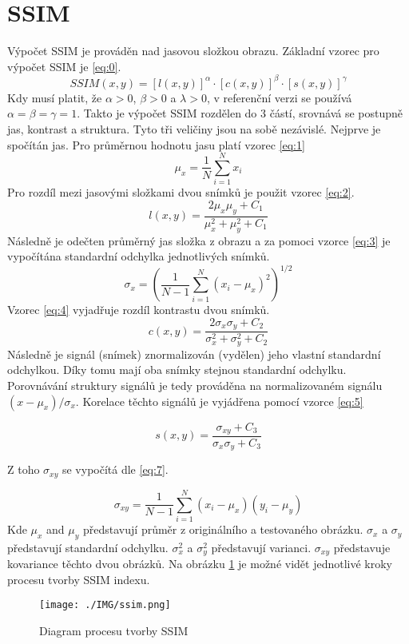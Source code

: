 \documentclass[thesis=M,czech]{FITthesis}[2016/06/26]
\begin{document}
\section{SSIM}
Výpočet SSIM je prováděn nad jasovou složkou obrazu. Základní vzorec pro výpočet SSIM je \ref{eq:0}.
\begin{equation}  \label{eq:0}
\mathit{SSIM}(x, y) = [l(x, y)]^{\alpha}\cdot[c(x, y)]^\beta\cdot[s(x, y)]^\gamma
\end{equation}
Kdy musí platit, že $\alpha > 0$, $\beta > 0$ a $\lambda > 0$, v referenční verzi se používá $\alpha = \beta = \gamma = 1$\cite{SSIM1}.
Takto je výpočet SSIM rozdělen do 3 částí, srovnává se postupně jas, kontrast a struktura. Tyto tři veličiny jsou na sobě nezávislé. Nejprve je spočítán jas. Pro průměrnou hodnotu jasu platí vzorec \ref{eq:1}
\begin{equation} \label{eq:1}
\mu_x = \frac{1}{N}\sum_{i=1}^{N}x_i
\end{equation}
Pro rozdíl mezi jasovými složkami dvou snímků je použit vzorec \ref{eq:2}.
\begin{equation} \label{eq:2}
l(x, y) = \frac{2\mu_x \mu_y + C_1}{\mu^2_x+\mu^2_y+C_1}
\end{equation}
Následně je odečten průměrný jas složka z obrazu a za pomoci vzorce \ref{eq:3} je vypočítána standardní odchylka jednotlivých snímků.
\begin{equation} \label{eq:3}
\sigma_x = \left(\frac{1}{N-1}\sum_{i=1}^{N}(x_i-\mu_x)^2\right)^{1/2}
\end{equation}
Vzorec \ref{eq:4} vyjadřuje rozdíl kontrastu dvou snímků.
\begin{equation}\label{eq:4}
c(x, y) = \frac{2\sigma_x \sigma_y + C_2}{\sigma^2_x+\sigma^2_y+C_2}
\end{equation}
Následně je signál (snímek) znormalizován (vydělen) jeho vlastní standardní odchylkou. Díky tomu mají oba snímky stejnou standardní odchylku. Porovnávání struktury signálů je tedy prováděna na normalizovaném signálu $(x-\mu_x)/\sigma_x$. Korelace těchto signálů je vyjádřena pomocí vzorce \ref{eq:5}

\begin{equation}\label{eq:5}
s(x, y) = \frac{\sigma_{xy} + C_3}{\sigma_x\sigma_y+C_3}
\end{equation}

Z toho $\sigma_{xy}$ se vypočítá dle \ref{eq:7}.

\begin{equation}\label{eq:7}
\sigma_{xy} = \frac{1}{N-1} \sum_{i=1}^{N} (x_i-\mu_x)(y_i-\mu_y)
\end{equation}
Kde  $\mu_x$ and $\mu_y$ představují průměr z originálního a testovaného obrázku. $\sigma_x$ a $\sigma_y$ představují standardní odchylku. $\sigma_x^2$ a $\sigma_y^2$ představují varianci. $\sigma_{xy}$ představuje kovariance těchto dvou obrázků.
Na obrázku \ref{fig:ssim} je možné vidět jednotlivé kroky procesu tvorby SSIM indexu.
\begin{figure}[h]\centering
\texttt{[image: ./IMG/ssim.png]}
\caption{Diagram procesu tvorby SSIM}
\label{fig:ssim}
\end{figure}
\end{document}
